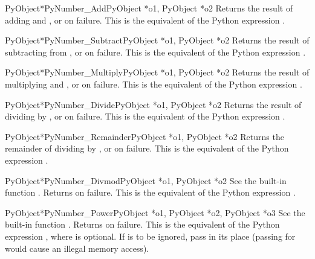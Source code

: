 \documentclass{manual}
\begin{document}
\begin{cfuncdesc}{PyObject*}{PyNumber_Add}{PyObject *o1, PyObject *o2}
Returns the result of adding  and , or \NULL{} on
failure.  This is the equivalent of the Python expression
.
\end{cfuncdesc}


\begin{cfuncdesc}{PyObject*}{PyNumber_Subtract}{PyObject *o1, PyObject *o2}
Returns the result of subtracting  from , or
\NULL{} on failure.  This is the equivalent of the Python expression
.
\end{cfuncdesc}


\begin{cfuncdesc}{PyObject*}{PyNumber_Multiply}{PyObject *o1, PyObject *o2}
Returns the result of multiplying  and , or \NULL{} on
failure.  This is the equivalent of the Python expression
.
\end{cfuncdesc}


\begin{cfuncdesc}{PyObject*}{PyNumber_Divide}{PyObject *o1, PyObject *o2}
Returns the result of dividing  by , or \NULL{} on
failure. 
This is the equivalent of the Python expression .
\end{cfuncdesc}


\begin{cfuncdesc}{PyObject*}{PyNumber_Remainder}{PyObject *o1, PyObject *o2}
Returns the remainder of dividing  by , or \NULL{} on
failure.  This is the equivalent of the Python expression
.
\end{cfuncdesc}


\begin{cfuncdesc}{PyObject*}{PyNumber_Divmod}{PyObject *o1, PyObject *o2}
See the built-in function .
Returns \NULL{} on failure.  This is the equivalent of the Python
expression .
\end{cfuncdesc}


\begin{cfuncdesc}{PyObject*}{PyNumber_Power}{PyObject *o1, PyObject *o2, PyObject *o3}
See the built-in function .  Returns
\NULL{} on failure. This is the equivalent of the Python expression
, where  is optional.
If  is to be ignored, pass  in its place
(passing \NULL{} for  would cause an illegal memory access).
\end{cfuncdesc}
\end{document}
